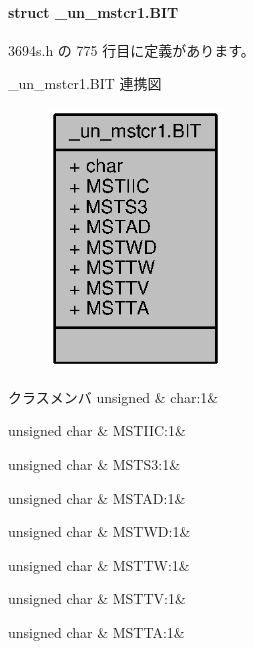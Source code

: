 \paragraph{struct \+\_\+un\+\_\+mstcr1.\+B\+I\+T}


 3694s.\+h の 775 行目に定義があります。



\+\_\+un\+\_\+mstcr1.\+B\+I\+T 連携図
\nopagebreak
\begin{figure}[H]
\begin{center}
\leavevmode
\includegraphics[width=131pt]{d7/d9c/struct__un__mstcr1_8BIT__coll__graph}
\end{center}
\end{figure}
\begin{DoxyFields}{クラスメンバ}
unsigned\label{3694s_8h_aa87deb01c5f539e6bda34829c8ef2368}
&
char\+:1&
\\
\hline

unsigned char\label{3694s_8h_afe54f2e00a07950d8d538653bb584ef8}
&
M\+S\+T\+I\+I\+C\+:1&
\\
\hline

unsigned char\label{3694s_8h_a9bef7512b103191ec8de402ed27b4ea4}
&
M\+S\+T\+S3\+:1&
\\
\hline

unsigned char\label{3694s_8h_a0715ed36d636b765c7d97d8584045d41}
&
M\+S\+T\+A\+D\+:1&
\\
\hline

unsigned char\label{3694s_8h_ae7f6066d6f669d48fc19f0583a4a919f}
&
M\+S\+T\+W\+D\+:1&
\\
\hline

unsigned char\label{3694s_8h_ae06bc544ae45f7f7a705b612eb4f8789}
&
M\+S\+T\+T\+W\+:1&
\\
\hline

unsigned char\label{3694s_8h_a5bb0b440bcb5ef4b55776185fcbbeaca}
&
M\+S\+T\+T\+V\+:1&
\\
\hline

unsigned char\label{3694s_8h_a73226d0e4f44e865a6126ae777c4ab63}
&
M\+S\+T\+T\+A\+:1&
\\
\hline

\end{DoxyFields}


